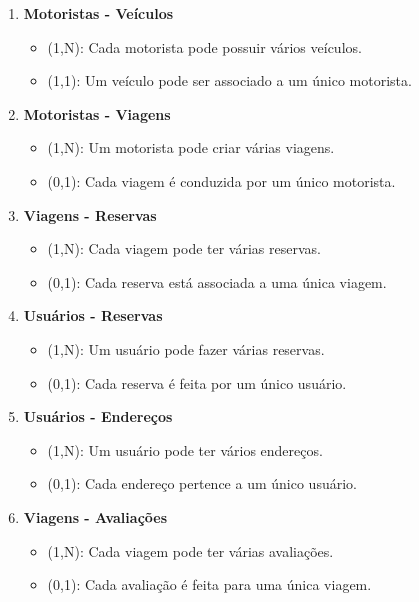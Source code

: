 \begin{enumerate}
	\item \textbf{Motoristas - Veículos}
	\begin{itemize}
		\item (1,N): Cada motorista pode possuir vários veículos.
		\item (1,1): Um veículo pode ser associado a um único motorista.
	\end{itemize}
	
	\item \textbf{Motoristas - Viagens}
	\begin{itemize}
		\item (1,N): Um motorista pode criar várias viagens.
		\item (0,1): Cada viagem é conduzida por um único motorista.
	\end{itemize}
	
	\item \textbf{Viagens - Reservas}
	\begin{itemize}
		\item (1,N): Cada viagem pode ter várias reservas.
		\item (0,1): Cada reserva está associada a uma única viagem.
	\end{itemize}
	
	\item \textbf{Usuários - Reservas}
	\begin{itemize}
		\item (1,N): Um usuário pode fazer várias reservas.
		\item (0,1): Cada reserva é feita por um único usuário.
	\end{itemize}
	
	\item \textbf{Usuários - Endereços}
	\begin{itemize}
		\item (1,N): Um usuário pode ter vários endereços.
		\item (0,1): Cada endereço pertence a um único usuário.
	\end{itemize}
	
	\item \textbf{Viagens - Avaliações}
	\begin{itemize}
		\item (1,N): Cada viagem pode ter várias avaliações.
		\item (0,1): Cada avaliação é feita para uma única viagem.
	\end{itemize}
	

\end{enumerate}
